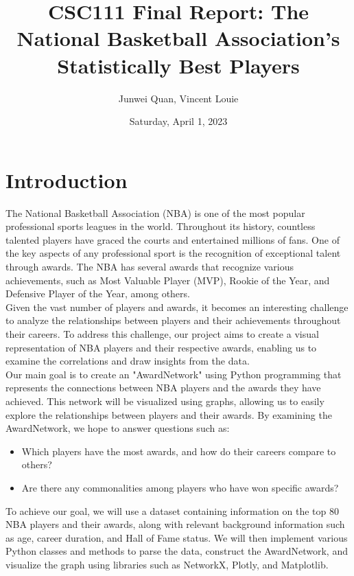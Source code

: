 \documentclass[fontsize=11pt]{article}
\title{CSC111 Final Report: The National Basketball Association's Statistically Best Players}
\author{Junwei Quan, Vincent Louie}
\date{Saturday, April 1, 2023}
\begin{document}
\maketitle

\section{Introduction}

\hspace{\parindent{}} 
The National Basketball Association (NBA) is one of the most popular professional sports leagues in the world. Throughout its history, countless talented players have graced the courts and entertained millions of fans. One of the key aspects of any professional sport is the recognition of exceptional talent through awards. The NBA has several awards that recognize various achievements, such as Most Valuable Player (MVP), Rookie of the Year, and Defensive Player of the Year, among others.\\

Given the vast number of players and awards, it becomes an interesting challenge to analyze the relationships between players and their achievements throughout their careers. To address this challenge, our project aims to create a visual representation of NBA players and their respective awards, enabling us to examine the correlations and draw insights from the data.\\

Our main goal is to create an "AwardNetwork" using Python programming that represents the connections between NBA players and the awards they have achieved. This network will be visualized using graphs, allowing us to easily explore the relationships between players and their awards. By examining the AwardNetwork, we hope to answer questions such as:\\

\begin{itemize}
    \item Which players have the most awards, and how do their careers compare to others?
    \item Are there any commonalities among players who have won specific awards?
\end{itemize}

To achieve our goal, we will use a dataset containing information on the top 80 NBA players and their awards, along with relevant background information such as age, career duration, and Hall of Fame status. We will then implement various Python classes and methods to parse the data, construct the AwardNetwork, and visualize the graph using libraries such as NetworkX, Plotly, and Matplotlib.\\
\end{document}
